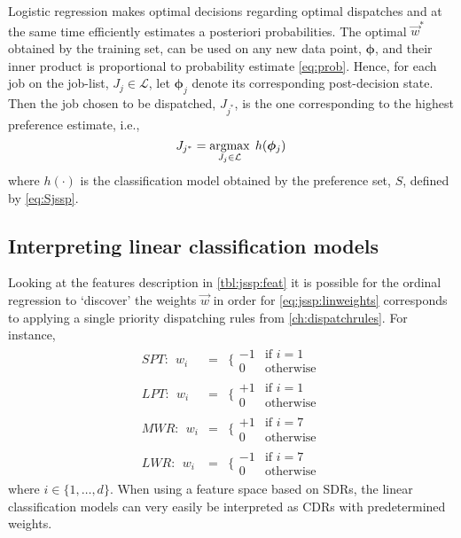 \documentclass[smallextended]{svjour3}
\renewcommand{\vphi}{\bm \phi}
\begin{document}
	Logistic regression makes optimal decisions regarding optimal dispatches and at the same time efficiently estimates a posteriori probabilities. The optimal $\vec{w}^*$ obtained by the training set, can be used on any new data point, $\vphi$, and their inner product is proportional to probability estimate \eqref{eq:prob}. Hence, for each job on the job-list, $J_j\in\mathcal{L}$, let $\vphi_j$ denote its corresponding  post-decision state. Then the job chosen to be dispatched, $J_{j^*}$, is the one corresponding to the highest preference estimate, i.e.,
	\begin{equation}\label{eq:lin}
	J_{j^*}=\argmax_{J_j\in \mathcal{L}}\; h(\vphi_j)
	\end{equation}
	where $h(\cdot)$ is the classification model obtained by the preference set, $S$, defined by \eqref{eq:Sjssp}. 
	
	\subsection{Interpreting linear classification models}\label{sec:learningmodels:interpret}
	Looking at the features description in \cref{tbl:jssp:feat} it is possible for the ordinal regression to `discover' the weights $\vec{w}$ in order for \eqref{eq:jssp:linweights} corresponds to applying a single priority dispatching rules from \cref{ch:dispatchrules}. For instance, 
	\begin{eqnarray*} %
	SPT:~~w_i&=&\bigg\{ \begin{array}{rl}-1&\text{if }i=1\\0&\text{otherwise}\end{array} \\
	LPT:~~w_i&=&\bigg\{ \begin{array}{rl}+1&\text{if }i=1\\0&\text{otherwise}\end{array} \\
	MWR:~~w_i&=&\bigg\{ \begin{array}{rl}+1&\text{if }i=7\\0&\text{otherwise}\end{array} \\
	LWR:~~w_i&=&\bigg\{ \begin{array}{rl}-1&\text{if }i=7\\0&\text{otherwise}\end{array}
	\end{eqnarray*}
	where $i\in\{1,\ldots,d\}$. %
	When using a feature space based on SDRs, the linear classification models can very easily be interpreted as CDRs with predetermined weights.
	
\end{document}
